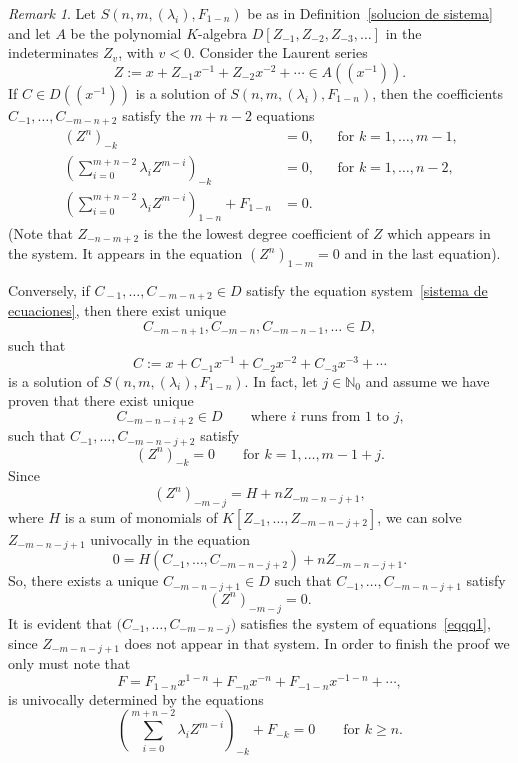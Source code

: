 \documentclass[reqno,a4paper]{amsart}
\theoremstyle{definition}
\theoremstyle{remark}
\newtheorem{remark}[theorem]{Remark}
\begin{document}
\begin{remark}\label{re 1.21} Let $S(n,m,(\lambda_i),F_{1-n})$ be as in
Definition~\ref{solucion de sistema} and let $A$ be the polynomial
$K$-algebra $D[Z_{-1},Z_{-2},Z_{-3},\dots]$ in the indeterminates $Z_v$, with $v<0$.
Consider the Laurent series
$$
Z := x+Z_{-1}x^{-1}+Z_{-2}x^{-2}+\cdots\in A((x^{-1})).
$$
If $C\!\in\! D((x^{-1}))$ is a solution of $S(n,m,(\lambda_i),F_{1-n})$, then the
coefficients $C_{-1},\dots,C_{-m-n+2}$ satisfy the $m+n-2$ equations
\begin{equation}
\begin{aligned}
(Z^n)_{-k} & = 0, && \text{for $k=1,\dots, m-1$,}\\
%
\left(\sum_{i=0}^{m+n-2}\lambda_i Z^{m-i}\right)_{-k} & = 0, &&\text{for $k=1,\dots,n-2$,}\\
%
\left(\sum_{i=0}^{m+n-2}\lambda_i Z^{m-i}\right)_{1-n} + F_{1-n} & = 0.
\end{aligned}\label{sistema de ecuaciones}
\end{equation}
(Note that $Z_{-n-m+2}$ is the the lowest degree coefficient of $Z$ which appears
in the system. It appears in the equation $(Z^n)_{1-m}=0$ and in the last equation).

\smallskip

Conversely, if $C_{\!-1},\dots,C_{\!-m-n+2}\!\in\! D$ satisfy the equation
system~\eqref{sistema de ecuaciones}, then there exist u\-ni\-que
$$
C_{-m-n+1},C_{-m-n}, C_{-m-n-1},\dots\in D,
$$
such that
\begin{equation}
C := x + C_{-1}x^{-1}+ C_{-2}x^{-2}+ C_{-3}x^{-3} + \cdots \label{solucion asociada}
\end{equation}
is a solution of $S(n,m,(\lambda_i),F_{1-n})$. In fact, let $j\in \mathds{N}_0$ and
assume we have proven that there exist unique
$$
C_{-m-n-i+2}\in D \qquad\text{where $i$ runs from $1$ to $j$,}
$$
such that $C_{-1},\dots, C_{-m-n-j+2}$ satisfy
\begin{equation}
(Z^n)_{-k} = 0\qquad\text{for $k=1,\dots,m-1+j$.}\label{eqqq1}
\end{equation}
Since
$$
(Z^n)_{-m-j} = H + n Z_{-m-n-j+1},
$$
where $H$ is a sum of monomials of $K[Z_{-1},\dots,Z_{-m-n-j+2}]$, we can solve
$Z_{-m-n-j+1}$ univocally in the equation
$$
0 = H(C_{-1},\dots,C_{-m-n-j+2}) + nZ_{-m-n-j+1}.
$$
So, there exists a unique $C_{-m-n-j+1}\in D$ such that $C_{-1},\dots, C_{-m-n-j+1}$ satisfy
\begin{equation*}
(Z^n)_{-m-j} = 0.
\end{equation*}
It is evident that $\bigl(C_{-1},\dots, C_{-m-n-j}\bigr)$ satisfies the system of
equations~\eqref{eqqq1}, since $Z_{-m-n-j+1}$ does not appear in that system. In
order to finish the proof we only must note that
$$
F = F_{1-n} x^{1-n} + F_{-n} x^{-n} + F_{-1-n} x^{-1-n} +\cdots,
$$
is univocally determined by the equations
$$
\left(\sum_{i=0}^{m+n-2}\lambda_i Z^{m-i}\right)_{-k} + F_{-k}  = 0\qquad\text{for $k\ge n$.}
$$
\end{remark}
\end{document}
